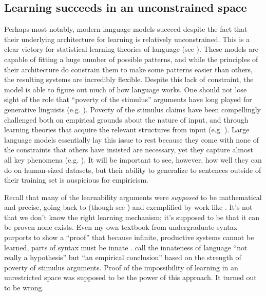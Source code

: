 \documentclass[output=paper,colorlinks,citecolor=brown
]{langscibook}
\begin{document}
\subsection*{Learning succeeds in an unconstrained space}

Perhaps most notably, modern language models succeed despite the fact that their underlying architecture for learning is relatively unconstrained. This is a clear victory for statistical learning theories of language (see \cite{contreras2023large}). These models are capable of fitting a huge number of possible patterns, and while the principles of their architecture do constrain them to make some patterns easier than others, the resulting systems are incredibly flexible. Despite this lack of constraint, the model is able to figure out much of how language works. One should not lose sight of the role that ``poverty of the stimulus'' arguments have long played for generative linguists (e.g. \cite{lasnik2016argument,crain2001nature,legate2002empirical,wexler1980formal,laurence2001poverty,pearl2022poverty,crain2002language}). Poverty of the stimulus claims have been compellingly challenged both on empirical grounds about the nature of input, and through learning theories that acquire the relevant structures from input (e.g. \cite{pullum2002empirical,clark2010linguistic,perfors2011learnability,reali2005uncovering,solan2005unsupervised}). Large language models essentially lay this issue to rest because they come with none of the constraints that others have insisted are necessary, yet they capture almost all key phenomena (e.g. \cite{wilcox2022using}). It will be important to see, however, how well they can do on human-sized datasets, but their ability to generalize to sentences outside of their training set is auspicious for empiricism.

Recall that many of the learnability arguments were \emph{supposed} to be mathematical and precise, going back to \cite{gold1967language} (though see \cite{johnson2004gold,chater2007ideal}) and exemplified by work like \cite{wexler1980formal}. It's not that we don't know the right learning mechanism; it's supposed to be that it can be proven none exists. Even my own textbook from undergraduate syntax purports to show a ``proof'' that because infinite, productive systems cannot be learned, parts of syntax must be innate \citep{carnie2021syntax}. \cite{legate2002empirical} call the innateness of language ``not really a hypothesis'' but ``an empirical conclusion'' based on the strength of poverty of stimulus arguments. Proof of the impossibility of learning in an unrestricted space was supposed to be the power of this approach. It turned out to be wrong.
\end{document}
